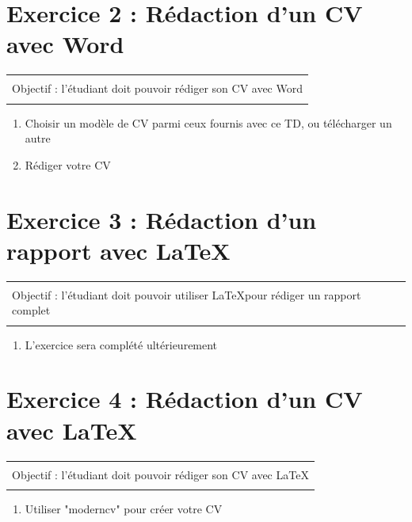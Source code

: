 \documentclass[11pt, a4paper]{article}
\begin{document}
\newpage
\section*{Exercice 2 : Rédaction d'un CV avec Word}

\vspace{-12pt}
\begin{tabular}{|p{\textwidth}|}
	\hline\\
	Objectif : l'étudiant doit pouvoir rédiger son CV avec Word \\\\
	\hline
\end{tabular}

\begin{enumerate}
	\item Choisir un modèle de CV parmi ceux fournis avec ce TD, ou télécharger un autre 
	\item Rédiger votre CV
\end{enumerate}

\section*{Exercice 3 : Rédaction d'un rapport avec \LaTeX}

\vspace{-12pt}
\begin{tabular}{|p{\textwidth}|}
	\hline\\
	Objectif : l'étudiant doit pouvoir utiliser \LaTeX pour rédiger un rapport complet \\\\
	\hline
\end{tabular}

\begin{enumerate}
	\item L'exercice sera complété ultérieurement
\end{enumerate}

\section*{Exercice 4 : Rédaction d'un CV avec \LaTeX}

\vspace{-12pt}
\begin{tabular}{|p{\textwidth}|}
	\hline\\
	Objectif : l'étudiant doit pouvoir rédiger son CV avec \LaTeX \\\\
	\hline
\end{tabular}

\begin{enumerate}
	\item Utiliser "moderncv" pour créer votre CV
\end{enumerate}
\end{document}

